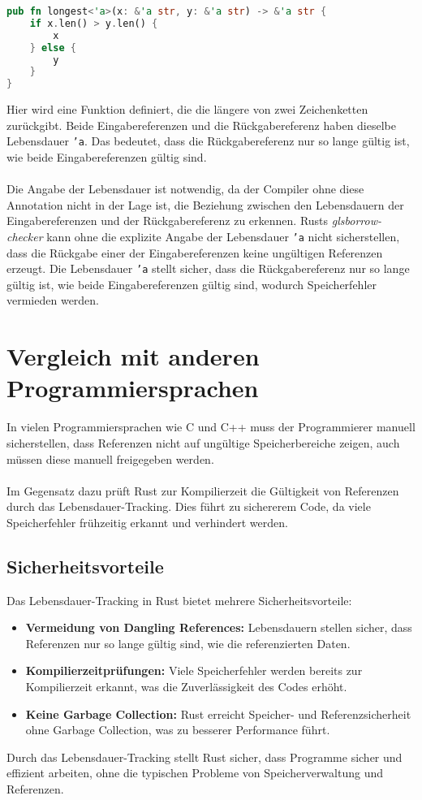 \begin{lstlisting}[language=Rust, caption={Expliziete lifetime}]
pub fn longest<'a>(x: &'a str, y: &'a str) -> &'a str {
    if x.len() > y.len() {
        x
    } else {
        y
    }
}
\end{lstlisting}
\noindent
Hier wird eine Funktion definiert, die die längere von zwei Zeichenketten zurückgibt. 
Beide Eingabereferenzen und die Rückgabereferenz haben dieselbe Lebensdauer \texttt{'a}. 
Das bedeutet, dass die Rückgabereferenz nur so lange gültig ist, wie beide Eingabereferenzen gültig sind.\\
\\
Die Angabe der Lebensdauer ist notwendig, da der Compiler ohne diese Annotation nicht in der Lage ist, die Beziehung zwischen den Lebensdauern der Eingabereferenzen und der Rückgabereferenz zu erkennen. 
Rusts \textit{gls{borrow-checker}} kann ohne die explizite Angabe der Lebensdauer \texttt{'a} nicht sicherstellen, dass die Rückgabe einer der Eingabereferenzen keine ungültigen Referenzen erzeugt. 
Die Lebensdauer \texttt{'a} stellt sicher, dass die Rückgabereferenz nur so lange gültig ist, wie beide Eingabereferenzen gültig sind, wodurch Speicherfehler vermieden werden.

\section{Vergleich mit anderen Programmiersprachen}
In vielen Programmiersprachen wie C und C++ muss der Programmierer manuell sicherstellen, dass Referenzen nicht auf ungültige Speicherbereiche zeigen, auch müssen diese manuell freigegeben werden. \\
\\
Im Gegensatz dazu prüft Rust zur Kompilierzeit die Gültigkeit von Referenzen durch das Lebensdauer-Tracking. 
Dies führt zu sichererem Code, da viele Speicherfehler frühzeitig erkannt und verhindert werden.

\subsection{Sicherheitsvorteile}
Das Lebensdauer-Tracking in Rust bietet mehrere Sicherheitsvorteile:

\begin{itemize}
    \item \textbf{Vermeidung von Dangling References:} Lebensdauern stellen sicher, dass Referenzen nur so lange gültig sind, wie die referenzierten Daten.
    \item \textbf{Kompilierzeitprüfungen:} Viele Speicherfehler werden bereits zur Kompilierzeit erkannt, was die Zuverlässigkeit des Codes erhöht.
    \item \textbf{Keine Garbage Collection:} Rust erreicht Speicher- und Referenzsicherheit ohne Garbage Collection, was zu besserer Performance führt.
\end{itemize}
\noindent
Durch das Lebensdauer-Tracking stellt Rust sicher, dass Programme sicher und effizient arbeiten, ohne die typischen Probleme von Speicherverwaltung und Referenzen.

